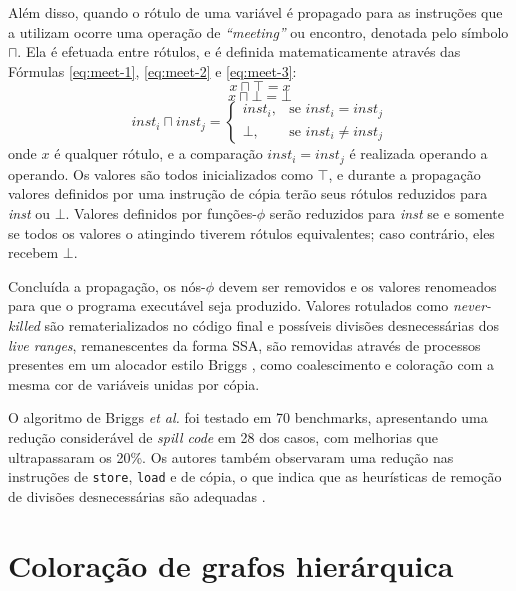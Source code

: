 \documentclass[
	12pt,				%
	openright,			%
	oneside,			%
	a4paper,			%
	tccpreliminar,			%
	]{ABNT-DC-UEL}
\begin{document}
Além disso, quando o rótulo de uma variável é propagado para as instruções que a utilizam ocorre uma operação de \textit{``meeting''} ou encontro, denotada pelo símbolo $\sqcap$. Ela é efetuada entre rótulos, e é definida matematicamente através das Fórmulas \ref{eq:meet-1}, \ref{eq:meet-2} e \ref{eq:meet-3}:
\begin{equation}
    x \sqcap \top = x
    \label{eq:meet-1}
\end{equation}
\begin{equation}
    x \sqcap \bot = \bot
    \label{eq:meet-2}
\end{equation}
\begin{equation}
    \mathit{inst}_i \sqcap \mathit{inst}_j = 
    \begin{cases}
        \mathit{inst}_i, & \text{se } \mathit{inst}_i = \mathit{inst}_j \\
        \bot, & \text{se } \mathit{inst}_i \ne \mathit{inst}_j
    \end{cases}
    \label{eq:meet-3}
\end{equation}
onde $x$ é qualquer rótulo, e a comparação $\mathit{inst}_i = \textit{inst}_j$ é realizada operando a operando. Os valores são todos inicializados como $\top$, e durante a propagação valores definidos por uma instrução de cópia terão seus rótulos reduzidos para \textit{inst} ou $\bot$. Valores definidos por funções-$\phi$ serão reduzidos para \textit{inst} se e somente se todos os valores o atingindo tiverem rótulos equivalentes; caso contrário, eles recebem $\bot$.

Concluída a propagação, os nós-$\phi$ devem ser removidos e os valores renomeados para que o programa executável seja produzido. Valores rotulados como \textit{never-killed} são rematerializados no código final e possíveis divisões desnecessárias dos \textit{live ranges}, remanescentes da forma SSA, são removidas através de processos presentes em um alocador estilo Briggs \cite{briggs:92}, como coalescimento e coloração com a mesma cor de variáveis unidas por cópia.

O algoritmo de Briggs \textit{et al.} foi testado em 70 benchmarks, apresentando uma redução considerável de \textit{spill code} em 28 dos casos, com melhorias que ultrapassaram os 20\%. Os autores também observaram uma redução nas instruções de \texttt{store}, \texttt{load} e de cópia, o que indica que as heurísticas de remoção de divisões desnecessárias são adequadas \cite{briggs2:92}.

\section{Coloração de grafos hierárquica}
\end{document}

